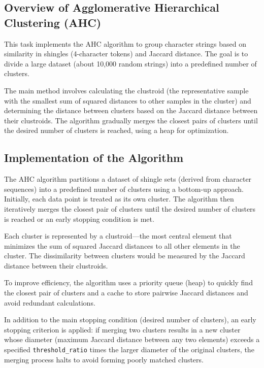 \subsection{Overview of Agglomerative Hierarchical Clustering (AHC)}
\label{subsec:overview-of-agglomerative-hierarchical-clustering}

This task implements the AHC algorithm to group character strings based on similarity in shingles (4-character tokens) and Jaccard distance.
The goal is to divide a large dataset (about 10,000 random strings) into a predefined number of clusters.

The main method involves calculating the clustroid (the representative sample with the smallest sum of squared distances to other samples in the cluster) and determining the distance between clusters based on the Jaccard distance between their clustroids.
The algorithm gradually merges the closest pairs of clusters until the desired number of clusters is reached, using a heap for optimization.

\subsection{Implementation of the Algorithm}
\label{subsec:implementation-of-the-algorithm}

The AHC algorithm partitions a dataset of shingle sets (derived from character sequences) into a predefined number of clusters using a bottom-up approach.
Initially, each data point is treated as its own cluster.
The algorithm then iteratively merges the closest pair of clusters until the desired number of clusters is reached or an early stopping condition is met.

Each cluster is represented by a clustroid—the most central element that minimizes the sum of squared Jaccard distances to all other elements in the cluster.
The dissimilarity between clusters would be measured by the Jaccard distance between their clustroids.

To improve efficiency, the algorithm uses a priority queue (heap) to quickly find the closest pair of clusters and a cache to store pairwise Jaccard distances and avoid redundant calculations.

In addition to the main stopping condition (desired number of clusters), an early stopping criterion is applied: if merging two clusters results in a new cluster whose diameter (maximum Jaccard distance between any two elements) exceeds a specified \texttt{threshold\_ratio} times the larger diameter of the original clusters, the merging process halts to avoid forming poorly matched clusters.

